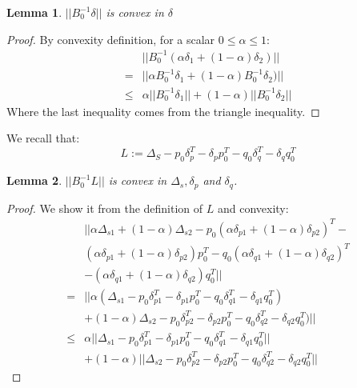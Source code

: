 \documentclass[11pt,twocolumn,varwidth=true,a4paper,fleqn]{article}
\newtheorem{lemma}{Lemma}
\begin{document}
\begin{lemma} \label{delta}
$||B_0^{-1}\delta||$ is convex in $\delta$
\end{lemma}
\begin{proof}
By convexity definition, for a scalar $0 \leq \alpha \leq 1$: 
\begin{equation} 
\begin{split}
& ||B_0^{-1}(\alpha\delta_1+(1-\alpha)\delta_2)|| \\
= & ||\alpha B_0^{-1}\delta_1+(1-\alpha)B_0^{-1}\delta_2)|| \\
\leq & \alpha||B_0^{-1}\delta_1||+(1-\alpha)||B_0^{-1}\delta_2||
\end{split}
\end{equation}
Where the last inequality comes from the triangle inequality.
\end{proof}

We recall that:
\begin{equation*} 
L:= \Delta_S - p_0\delta_p^T - \delta_pp_0^T - q_0\delta_q^T - \delta_qq_0^T
\end{equation*}
\begin{lemma} \label{L}
$||B_0^{-1}L||$ is convex in $\Delta_s, \delta_p$
and $\delta_q$.
\end{lemma}
\begin{proof}
We show it from the definition of $L$ and convexity:
\begin{equation*} 
\begin{split}
& ||\alpha\Delta_{s1}+(1-\alpha)\Delta_{s2} -
p_0(\alpha\delta_{p1}+(1-\alpha)\delta_{p2})^T - \\
& (\alpha\delta_{p1}+(1-\alpha)\delta_{p2})p_0^T -
q_0(\alpha\delta_{q1}+(1-\alpha)\delta_{q2})^T \\
& - (\alpha\delta_{q1}+(1-\alpha)\delta_{q2})q_0^T || \\
= & ||\alpha(\Delta_{s1} - p_0\delta_{p1}^T - \delta_{p1}p_0^T -
q_0\delta_{q1}^T - \delta_{q1}q_0^T) \\
& + (1-\alpha)\Delta_{s2} - p_0\delta_{p2}^T - \delta_{p2}p_0^T -
q_0\delta_{q2}^T - \delta_{q2}q_0^T)|| \\
\leq & \alpha||\Delta_{s1} - p_0\delta_{p1}^T - \delta_{p1}p_0^T -
q_0\delta_{q1}^T - \delta_{q1}q_0^T|| \\
& + (1-\alpha)||\Delta_{s2} - p_0\delta_{p2}^T - \delta_{p2}p_0^T -
q_0\delta_{q2}^T - \delta_{q2}q_0^T||
\end{split}
\end{equation*}
\end{proof}
\end{document}
